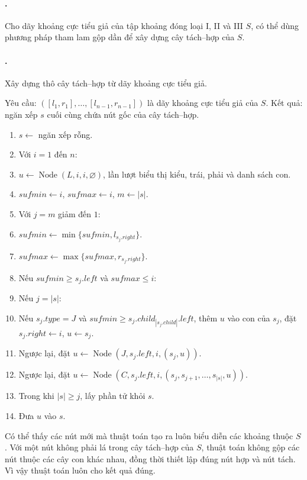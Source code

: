 \documentclass[11pt]{article}
\begin{document}
\paragraph{.}
Cho dãy khoảng cực tiểu giả của tập khoảng đóng loại I, II và III $S$, có thể
dùng phương pháp tham lam gộp dần để xây dựng cây tách--hợp của $S$.

\paragraph{.}
Xây dựng thô cây tách--hợp từ dãy khoảng cực tiểu giả.

Yêu cầu:
$([l_1,r_1],\ldots,[l_{n-1},r_{n-1}])$ là dãy khoảng cực tiểu giả của $S$.
Kết quả: ngăn xếp $s$ cuối cùng chứa nút gốc của cây tách--hợp.
\begin{enumerate}
  \item $s\leftarrow$ ngăn xếp rỗng.
  \item Với $i=1$ đến $n$:
  \item \quad $u\leftarrow \operatorname{Node}(L,i,i,\varnothing)$, lần lượt
  biểu thị kiểu, trái, phải và danh sách con.
  \item \quad $sufmin\leftarrow i$, $sufmax\leftarrow i$, $m\leftarrow |s|$.
  \item \quad Với $j=m$ giảm đến $1$:
  \item \quad\quad $sufmin\leftarrow\min\{sufmin,l_{s_j.right}\}$.
  \item \quad\quad $sufmax\leftarrow\max\{sufmax,r_{s_j.right}\}$.
  \item \quad\quad Nếu $sufmin\ge s_j.left$ và $sufmax\le i$:
  \item \quad\quad\quad Nếu $j=|s|$:
  \item \quad\quad\quad\quad Nếu $s_j.type=J$ và
  $sufmin\ge s_j.child_{|s_j.child|}.left$, thêm $u$ vào con của $s_j$,
  đặt $s_j.right\leftarrow i$, $u\leftarrow s_j$.
  \item \quad\quad\quad\quad Ngược lại, đặt
  $u\leftarrow\operatorname{Node}(J,s_j.left,i,(s_j,u))$.
  \item \quad\quad\quad Ngược lại, đặt
  $u\leftarrow\operatorname{Node}(C,s_j.left,i,(s_j,s_{j+1},\ldots,s_{|s|},u))$.
  \item \quad\quad\quad Trong khi $|s|\ge j$, lấy phần tử khỏi $s$.
  \item \quad Đưa $u$ vào $s$.
\end{enumerate}

Có thể thấy các nút mới mà thuật toán tạo ra luôn biểu diễn các khoảng thuộc
$S$. Với một nút không phải lá trong cây tách--hợp của $S$, thuật toán không
gộp các nút thuộc các cây con khác nhau, đồng thời thiết lập đúng nút hợp và
nút tách. Vì vậy thuật toán luôn cho kết quả đúng.
\end{document}

